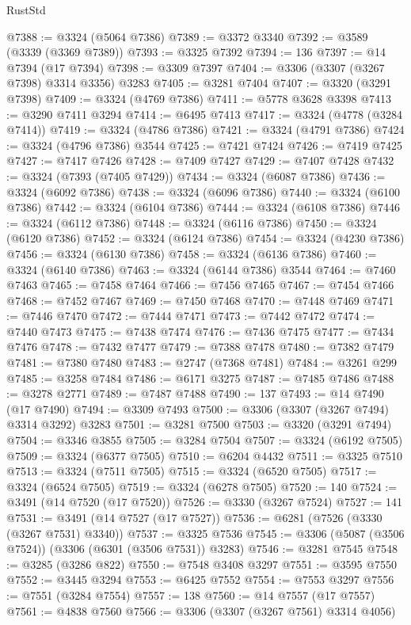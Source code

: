 \begin{lexlean}{RustStd}
\begin{coremodule}
@7388 := @3324 (@5064 @7386)
@7389 := @3372 @3340
@7392 := @3589 (@3339 (@3369 @7389))
@7393 := @3325 @7392
@7394 := 136
@7397 := @14 @7394 (@17 @7394)
@7398 := @3309 @7397
@7404 := @3306 (@3307 (@3267 @7398) @3314 @3356) @3283
@7405 := @3281 @7404
@7407 := @3320 (@3291 @7398)
@7409 := @3324 (@4769 @7386)
@7411 := @5778 @3628 @3398
@7413 := @3290 @7411 @3294
@7414 := @6495 @7413
@7417 := @3324 (@4778 (@3284 @7414))
@7419 := @3324 (@4786 @7386)
@7421 := @3324 (@4791 @7386)
@7424 := @3324 (@4796 @7386) @3544
@7425 := @7421 @7424
@7426 := @7419 @7425
@7427 := @7417 @7426
@7428 := @7409 @7427
@7429 := @7407 @7428
@7432 := @3324 (@7393 (@7405 @7429))
@7434 := @3324 (@6087 @7386)
@7436 := @3324 (@6092 @7386)
@7438 := @3324 (@6096 @7386)
@7440 := @3324 (@6100 @7386)
@7442 := @3324 (@6104 @7386)
@7444 := @3324 (@6108 @7386)
@7446 := @3324 (@6112 @7386)
@7448 := @3324 (@6116 @7386)
@7450 := @3324 (@6120 @7386)
@7452 := @3324 (@6124 @7386)
@7454 := @3324 (@4230 @7386)
@7456 := @3324 (@6130 @7386)
@7458 := @3324 (@6136 @7386)
@7460 := @3324 (@6140 @7386)
@7463 := @3324 (@6144 @7386) @3544
@7464 := @7460 @7463
@7465 := @7458 @7464
@7466 := @7456 @7465
@7467 := @7454 @7466
@7468 := @7452 @7467
@7469 := @7450 @7468
@7470 := @7448 @7469
@7471 := @7446 @7470
@7472 := @7444 @7471
@7473 := @7442 @7472
@7474 := @7440 @7473
@7475 := @7438 @7474
@7476 := @7436 @7475
@7477 := @7434 @7476
@7478 := @7432 @7477
@7479 := @7388 @7478
@7480 := @7382 @7479
@7481 := @7380 @7480
@7483 := @2747 (@7368 @7481)
@7484 := @3261 @299
@7485 := @3258 @7484
@7486 := @6171 @3275
@7487 := @7485 @7486
@7488 := @3278 @2771
@7489 := @7487 @7488
@7490 := 137
@7493 := @14 @7490 (@17 @7490)
@7494 := @3309 @7493
@7500 := @3306 (@3307 (@3267 @7494) @3314 @3292) @3283
@7501 := @3281 @7500
@7503 := @3320 (@3291 @7494)
@7504 := @3346 @3855
@7505 := @3284 @7504
@7507 := @3324 (@6192 @7505)
@7509 := @3324 (@6377 @7505)
@7510 := @6204 @4432
@7511 := @3325 @7510
@7513 := @3324 (@7511 @7505)
@7515 := @3324 (@6520 @7505)
@7517 := @3324 (@6524 @7505)
@7519 := @3324 (@6278 @7505)
@7520 := 140
@7524 := @3491 (@14 @7520 (@17 @7520))
@7526 := @3330 (@3267 @7524)
@7527 := 141
@7531 := @3491 (@14 @7527 (@17 @7527))
@7536 := @6281 (@7526 (@3330 (@3267 @7531) @3340))
@7537 := @3325 @7536
@7545 := @3306 (@5087 (@3506 @7524)) (@3306 (@6301 (@3506 @7531)) @3283)
@7546 := @3281 @7545
@7548 := @3285 (@3286 @822)
@7550 := @7548 @3408 @3297
@7551 := @3595 @7550
@7552 := @3445 @3294
@7553 := @6425 @7552
@7554 := @7553 @3297
@7556 := @7551 (@3284 @7554)
@7557 := 138
@7560 := @14 @7557 (@17 @7557)
@7561 := @4838 @7560
@7566 := @3306 (@3307 (@3267 @7561) @3314 @4056)

\end{coremodule}
\end{lexlean}
